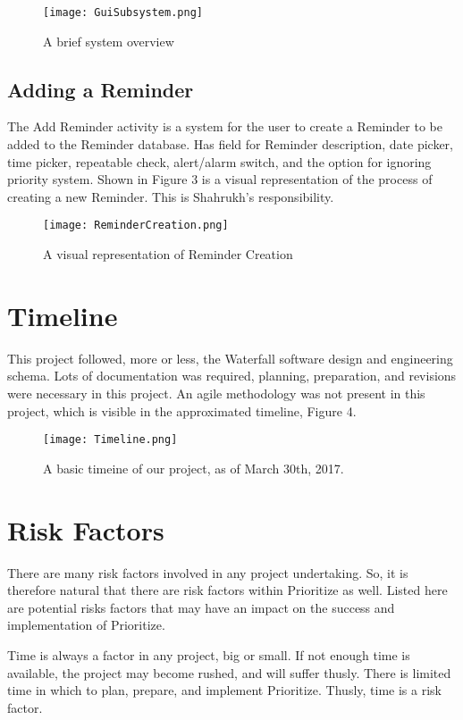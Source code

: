 \documentclass[12pt]{article}
\begin{document}
\begin{figure}[h]
\texttt{[image: GuiSubsystem.png]}
\centering
\caption{A brief system overview}
\end{figure}

\subsection{Adding a Reminder}
The Add Reminder activity is a system for the user to create a Reminder to be added to the Reminder database. Has field for Reminder description, date picker, time picker, repeatable check, alert/alarm switch, and the option for ignoring priority system. Shown in Figure 3 is a visual representation of the process of creating a new Reminder. This is Shahrukh's responsibility.

\begin{figure}[h]
\texttt{[image: ReminderCreation.png]}
\centering
\caption{A visual representation of Reminder Creation}
\end{figure}

\section{Timeline}

This project followed, more or less, the Waterfall software design and engineering schema. Lots of documentation was required, planning, preparation, and revisions were necessary in this project. An agile methodology was not present in this project, which is visible in the approximated timeline, Figure 4.

\begin{figure}[h]
\texttt{[image: Timeline.png]}
\centering
\caption{A basic timeine of our project, as of March 30th, 2017.}
\end{figure}


\section{Risk Factors}
There are many risk factors involved in any project undertaking. So, it is therefore natural that there are risk factors within Prioritize as well. Listed here are potential risks factors that may have an impact on the success and implementation of Prioritize.

Time is always a factor in any project, big or small. If not enough time is available, the project may become rushed, and will suffer thusly. There is limited time in which to plan, prepare, and implement Prioritize. Thusly, time is a risk factor.
\end{document}

